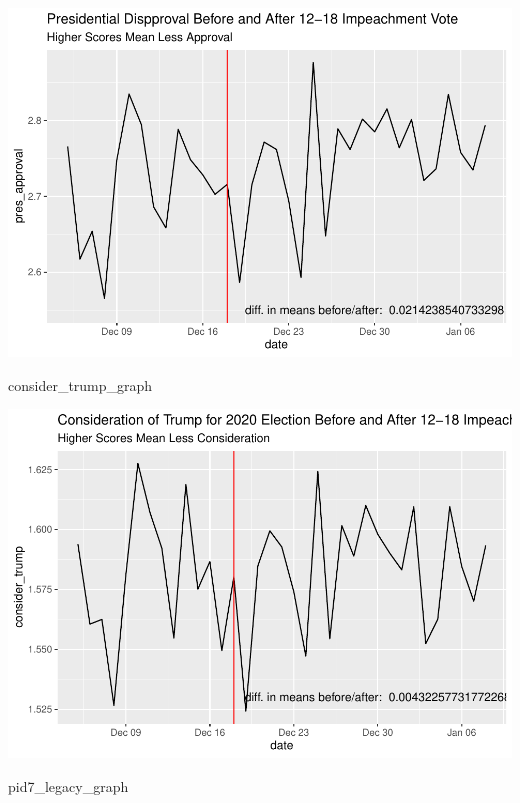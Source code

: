 \documentclass[
]{article}
\newenvironment{Shaded}{\begin{snugshade}}{\end{snugshade}}
\newcommand{\NormalTok}[1]{#1}
\begin{document}
\includegraphics{data_assignment10_nov_11_2021_files/figure-latex/graphing-1.pdf}

\begin{Shaded}
\begin{Highlighting}[]
\NormalTok{consider_trump_graph}
\end{Highlighting}
\end{Shaded}

\includegraphics{data_assignment10_nov_11_2021_files/figure-latex/graphing-2.pdf}

\begin{Shaded}
\begin{Highlighting}[]
\NormalTok{pid7_legacy_graph}
\end{Highlighting}
\end{Shaded}
\end{document}

